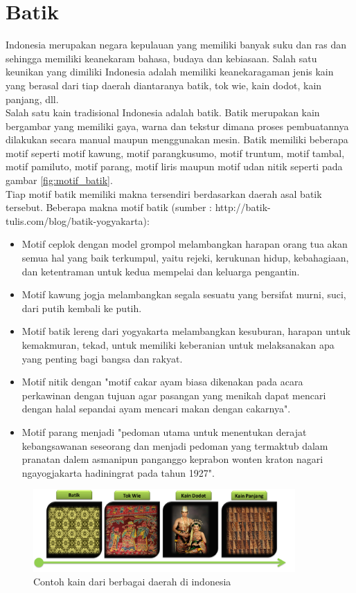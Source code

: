 \section{Batik}
Indonesia merupakan negara kepulauan yang memiliki banyak suku dan ras dan sehingga memiliki keanekaram bahasa, budaya dan kebiasaan. Salah satu keunikan yang dimiliki Indonesia adalah memiliki keanekaragaman jenis kain yang berasal dari tiap daerah diantaranya batik, tok wie, kain dodot, kain panjang, dll.\\
Salah satu kain tradisional Indonesia adalah batik. Batik merupakan kain bergambar yang memiliki gaya, warna dan tekstur dimana proses pembuatannya dilakukan secara manual maupun menggunakan mesin. Batik memiliki beberapa motif seperti motif kawung, motif parangkusumo, motif truntum, motif tambal, motif pamiluto, motif parang, motif liris maupun motif udan nitik seperti pada gambar \ref{fig:motif_batik}.\\
Tiap motif batik memiliki makna tersendiri berdasarkan daerah asal batik tersebut. Beberapa makna motif batik (sumber : http://batik-tulis.com/blog/batik-yogyakarta):
\begin{itemize}
	\item Motif ceplok dengan model grompol melambangkan harapan orang tua akan semua hal yang baik terkumpul, yaitu rejeki, kerukunan hidup, kebahagiaan, dan ketentraman untuk kedua mempelai dan keluarga pengantin.
	\item Motif kawung jogja melambangkan segala sesuatu yang bersifat murni, suci, dari putih kembali ke putih.
	\item Motif batik lereng dari yogyakarta melambangkan kesuburan, harapan untuk kemakmuran, tekad, untuk memiliki keberanian untuk melaksanakan apa yang penting bagi bangsa dan rakyat.
	\item Motif nitik dengan "motif cakar ayam biasa dikenakan pada acara perkawinan dengan tujuan agar pasangan yang menikah dapat mencari dengan halal sepandai ayam mencari makan dengan cakarnya".
	\item Motif parang menjadi "pedoman utama untuk menentukan derajat kebangsawanan seseorang dan menjadi pedoman yang termaktub dalam pranatan dalem asmanipun panganggo keprabon wonten kraton nagari ngayogjakarta hadiningrat pada tahun 1927".
\end{itemize} 
\begin{figure}[htp]
	\centering
	\includegraphics[width=10cm]{pics/kain_indonesia}
	\caption{Contoh kain dari berbagai daerah di indonesia}
	\label{fig:kain_indonesia}
\end{figure}

